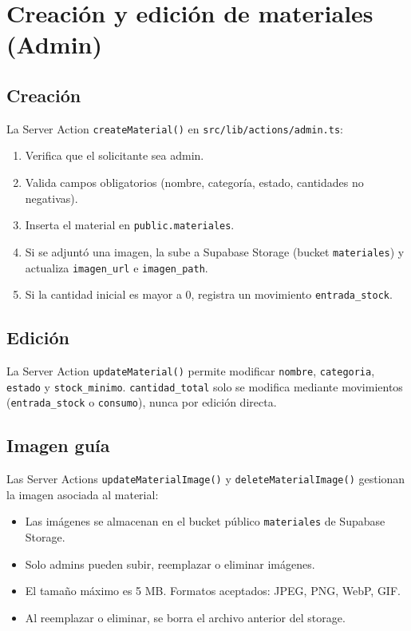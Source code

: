 \documentclass[12pt,a4paper,oneside]{report}
\newcommand{\file}[1]{\texttt{\color{cecyteDark}#1}}
\begin{document}
\section{Creación y edición de materiales (Admin)}

\subsection{Creación}

La Server Action \file{createMaterial()} en \file{src/lib/actions/admin.ts}:

\begin{enumerate}
  \item Verifica que el solicitante sea admin.
  \item Valida campos obligatorios (nombre, categoría, estado, cantidades no negativas).
  \item Inserta el material en \file{public.materiales}.
  \item Si se adjuntó una imagen, la sube a Supabase Storage (bucket \file{materiales}) y actualiza \file{imagen\_url} e \file{imagen\_path}.
  \item Si la cantidad inicial es mayor a 0, registra un movimiento \file{entrada\_stock}.
\end{enumerate}

\subsection{Edición}

La Server Action \file{updateMaterial()} permite modificar \file{nombre}, \file{categoria}, \file{estado} y \file{stock\_minimo}. \file{cantidad\_total} solo se modifica mediante movimientos (\file{entrada\_stock} o \file{consumo}), nunca por edición directa.

\subsection{Imagen guía}

Las Server Actions \file{updateMaterialImage()} y \file{deleteMaterialImage()} gestionan la imagen asociada al material:

\begin{itemize}
  \item Las imágenes se almacenan en el bucket público \file{materiales} de Supabase Storage.
  \item Solo admins pueden subir, reemplazar o eliminar imágenes.
  \item El tamaño máximo es 5 MB. Formatos aceptados: JPEG, PNG, WebP, GIF.
  \item Al reemplazar o eliminar, se borra el archivo anterior del storage.
\end{itemize}
\end{document}
